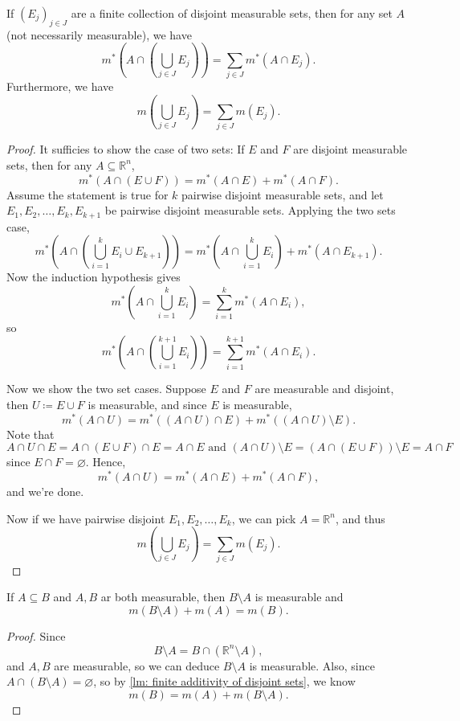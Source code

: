 \begin{lemma} \label{lm: finite additivity of disjoint sets}
    If \((E_j)_{j \in J}\) are a finite collection of disjoint measurable sets, then for any set \(A\) (not necessarily measurable), we have 
    \[
        m^* \left( A \cap \left( \bigcup_{j \in J} E_j  \right)  \right) = \sum_{j \in J} m^*(A \cap E_j).  
    \]
    Furthermore, we have 
    \[
        m \left( \bigcup_{j \in J} E_j  \right) = \sum_{j \in J} m(E_j ).  
    \]  
\end{lemma}

\begin{proof}
    It sufficies to show the case of two sets: If \(E\) and \(F\) are disjoint measurable sets, then for any \(A \subseteq \mathbb{R} ^n\), 
    \[
        m^*(A \cap (E \cup F)) = m^*(A \cap E) + m^*(A \cap F).
    \]   
    Assume the statement is true for \(k\) pairwise disjoint measurable sets, and let \(E_1, E_2, \dots ,E_k, E_{k+1}\) be pairwise disjoint measurable sets. Applying the two sets case,
    \[
        m^*(A \cap (\bigcup_{i=1}^{k} E_i \cup E_{k+1})) = m^*(A \cap \bigcup_{i=1}^{k} E_i ) + m^*(A \cap E_{k+1}).
    \]   
    Now the induction hypothesis gives 
    \[
        m^*(A \cap \bigcup_{i=1}^{k} E_i ) = \sum_{i=1}^k m^*(A \cap E_i), 
    \]
    so 
    \[
        m^* (A \cap \left( \bigcup_{i=1}^{k+1} E_i  \right) ) = \sum_{i=1}^{k+1} m^*(A \cap E_i). 
    \]

    Now we show the two set cases. Suppose \(E\) and \(F\) are measurable and disjoint, then \(U \coloneqq E \cup F\) is measurable, and since \(E\) is measurable,
    \[
        m^*(A \cap U) = m^*((A \cap U) \cap E) + m^*((A \cap U) \setminus E).
    \]   
    Note that 
    \[
        A \cap U \cap E = A \cap (E \cup F) \cap E = A \cap E \text{ and } (A \cap U) \setminus E = (A \cap (E \cup F)) \setminus E = A \cap F
    \]
    since \(E \cap F = \varnothing\). Hence,
    \[
        m^*(A \cap U) = m^*(A \cap E) + m^*(A \cap F),
    \]
    and we're done.

    Now if we have pairwise disjoint \(E_1, E_2, \dots , E_k\), we can pick \(A = \mathbb{R}^n \), and thus 
    \[
      m(\bigcup_{j \in J} E_j ) = \sum_{j \in J} m(E_j).  
    \]  
\end{proof}

\begin{corollary}
    If \(A \subseteq B\) and \(A, B\) ar both measurable, then \(B \setminus A\) is measurable and
    \[
        m(B \setminus A) + m(A) = m(B).
    \]   
\end{corollary}
\begin{proof}
    Since 
    \[
        B \setminus A = B \cap (\mathbb{R} ^n \setminus A),
    \]
    and \(A, B\) are measurable, so we can deduce \(B \setminus A\) is measurable. Also, since \(A \cap (B \setminus A) = \varnothing\), so by \autoref{lm: finite additivity of disjoint sets}, we know 
    \[
        m(B) = m(A) + m(B \setminus A).
    \] 
\end{proof}

